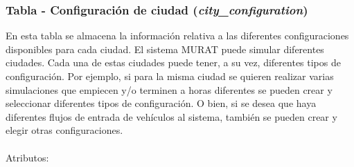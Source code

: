 \subsubsection{Tabla - Configuración de ciudad (\textit{city\_configuration})}
En esta tabla se almacena la información relativa a las diferentes configuraciones disponibles para cada ciudad. El sistema MURAT puede simular diferentes ciudades. Cada una de estas ciudades puede tener, a su vez, diferentes tipos de configuración. Por ejemplo, si para la misma ciudad se quieren realizar varias simulaciones que empiecen y/o terminen a horas diferentes se pueden crear y seleccionar diferentes tipos de configuración. O bien, si se desea que haya diferentes flujos de entrada de vehículos al sistema, también se pueden crear y elegir otras configuraciones.\\\\
Atributos:
